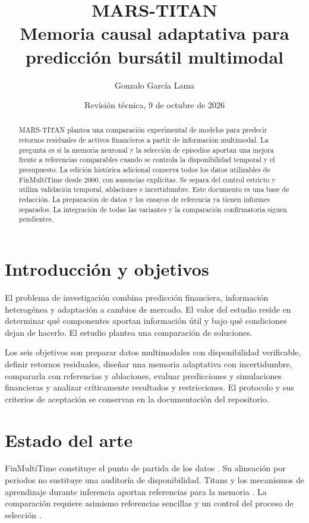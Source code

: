 \documentclass[11pt,a4paper]{report}
\title{MARS-TITAN\\\large Memoria causal adaptativa para predicción bursátil multimodal}
\author{Gonzalo García Lama}
\date{Revisión técnica, 9 de octubre de 2026}
\begin{document}
\maketitle
\begin{abstract}
MARS-TITAN plantea una comparación experimental de modelos para predecir
retornos residuales de activos financieros a partir de información multimodal.
La pregunta es si la memoria neuronal y la selección de episodios aportan una
mejora frente a referencias comparables cuando se controla la disponibilidad
temporal y el presupuesto. La edición histórica adicional conserva todos los
datos utilizables de FinMultiTime desde 2000, con ausencias explícitas. Se separa
del control estricto y utiliza validación temporal, ablaciones e incertidumbre.
Este documento es una base de redacción. La preparación de datos y los ensayos
de referencia ya tienen informes separados. La integración de todas las variantes
y la comparación confirmatoria siguen pendientes.
\end{abstract}
\tableofcontents

\chapter{Introducción y objetivos}
El problema de investigación combina predicción financiera, información
heterogénea y adaptación a cambios de mercado. El valor del estudio reside en
determinar qué componentes aportan información útil y bajo qué condiciones
dejan de hacerlo. El estudio plantea una comparación de soluciones.

Los seis objetivos son preparar datos multimodales con disponibilidad verificable,
definir retornos residuales, diseñar una memoria adaptativa con incertidumbre,
compararla con referencias y ablaciones, evaluar predicciones y simulaciones
financieras y analizar críticamente resultados y restricciones. El protocolo y
sus criterios de aceptación se conservan en la documentación del repositorio.

\chapter{Estado del arte}
FinMultiTime constituye el punto de partida de los datos
\parencite{xu2025finmultitime}. Su alineación por periodos no sustituye una auditoría
de disponibilidad. Titans y los mecanismos de aprendizaje durante inferencia
aportan referencias para la memoria \parencite{behrouz2025titans,sun2025ttt}.
La comparación requiere asimismo referencias sencillas y un control del proceso
de selección \parencite{zeng2023dlinear,bailey2017pbo}.
\end{document}
